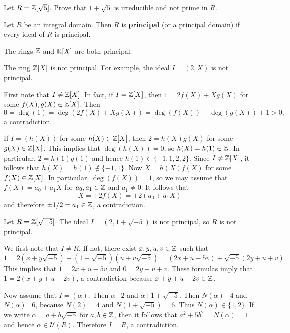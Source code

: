 \begin{exercise}
	Let $R=\mathbb{Z}[\sqrt{5}]$. Prove that $1+\sqrt{5}$ is irreducible and not prime in $R$. 	
\end{exercise}

\begin{definition}
	Let $R$ be an integral domain. Then $R$ is \textbf{principal} (or a principal domain) if
	every ideal of $R$ is principal.  
\end{definition}

The rings $\mathbb{Z}$ and $\mathbb{R}[X]$ are both principal. 

\begin{example}
	The ring $\mathbb{Z}[X]$ is not principal. For example, the ideal
	$I=(2,X)$ is not principal. 
	
	First note that $I\ne\mathbb{Z}[X]$. In fact, if $I=\mathbb{Z}[X]$, then 
	$1=2f(X)+Xg(X)$ for some $f(X),g(X)\in\mathbb{Z}[X]$. Then
	\[
	0=\deg(1)=\deg(2f(X)+Xg(X))=\deg(f(X))+\deg(g(X))+1>0,
	\]	
	a contradiction. 
	
	If $I=(h(X))$ for some $h(X)\in\mathbb{Z}[X]$, then $2=h(X)g(X)$ for some $g(X)\in\mathbb{Z}[X]$. This
	implies that $\deg(h(X))=0$, so $h(X)=h(1)\in\mathbb{Z}$. In particular, $2=h(1)g(1)$ and hence
	$h(1)\in\{-1,1,2,2\}$. Since $I\ne\mathbb{Z}[X]$, it follows that $h(X)=h(1)\not\in\{-1,1\}$. Now      
	$X=h(X)f(X)$ for some $f(X)\in\mathbb{Z}[X]$. In particular, $\deg(f(X))=1$, so
	we may assume that $f(X)=a_0+a_1X$ for $a_0,a_1\in\mathbb{Z}$ and $a_1\ne 0$. 	
	It follows that 
	\[
	X=\pm 2f(X)=\pm2(a_0+a_1X)
	\]
	and therefore $\pm1/2=a_1\in\mathbb{Z}$, a contradiction.
\end{example}

\begin{example}
	Let $R=\mathbb{Z}[\sqrt{-5}]$.  
	The ideal $I=(2,1+\sqrt{-5})$ is not principal, so $R$ is not principal. 
	
	We first note that $I\ne R$. If not, there exist $x,y,u,v\in\mathbb{Z}$ such that 
	\[
	1=2(x+y\sqrt{-5})+(1+\sqrt{-5})(u+v\sqrt{-5})=(2x+u-5v)+\sqrt{-5}(2y+u+v).
	\]
	This implies that $1=2x+u-5v$ and $0=2y+u+v$. These formulas imply that
	$1=2(x+y+u-2v)$, a contradiction because $x+y+u-2v\in\mathbb{Z}$. 
	
	Now assume that $I=(\alpha)$. Then $\alpha\mid 2$ and $\alpha\mid 1+\sqrt{-5}$. Then
	$N(\alpha)\mid 4$ and $N(\alpha)\mid 6$, because $N(2)=4$ and $N(1+\sqrt{-5})=6$. 
	Thus $N(\alpha)\in\{1,2\}$. If we write
	$\alpha=a+b\sqrt{-5}$ for $a,b\in\mathbb{Z}$, then it follows that 
	$a^2+5b^2=N(\alpha)=1$ and hence $\alpha\in\mathcal{U}(R)$. 
	Therefore $I=R$, a contradiction.   
\end{example}

